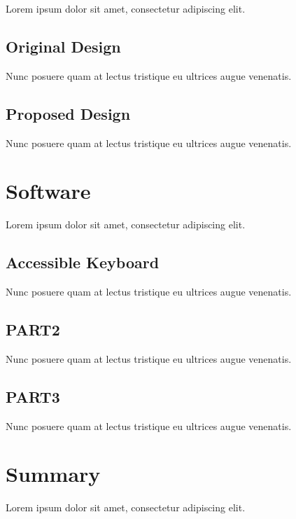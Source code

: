 Lorem ipsum dolor sit amet, consectetur adipiscing elit.

\subsection{Original Design}

Nunc posuere quam at lectus tristique eu ultrices augue venenatis.

\subsection{Proposed Design}

Nunc posuere quam at lectus tristique eu ultrices augue venenatis.



\section{Software}

Lorem ipsum dolor sit amet, consectetur adipiscing elit.

\subsection{Accessible Keyboard}

Nunc posuere quam at lectus tristique eu ultrices augue venenatis.

\subsection{PART2}

Nunc posuere quam at lectus tristique eu ultrices augue venenatis.

\subsection{PART3}

Nunc posuere quam at lectus tristique eu ultrices augue venenatis.


\section{Summary}

Lorem ipsum dolor sit amet, consectetur adipiscing elit.